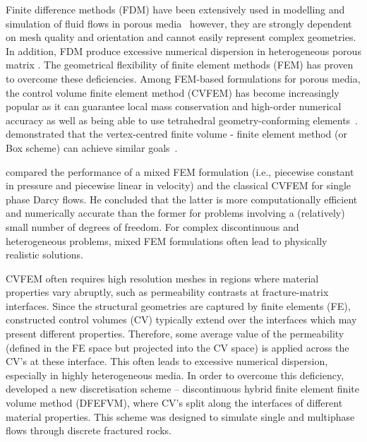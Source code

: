 \documentclass[preprint,authoryear,12pt]{elsarticle}
\begin{document}
Finite difference methods (FDM) have been extensively used in modelling and simulation of fluid flows in porous media~\citep{aziz_1986, chen_1997, chen_2005} however, they are strongly dependent on mesh quality and orientation and cannot easily represent complex geometries. In addition, FDM produce excessive numerical dispersion in heterogeneous porous matrix \citep{chavent_1986}. The geometrical flexibility of finite element methods (FEM) has proven to overcome these deficiencies. Among FEM-based formulations for porous media, the control volume finite element method (CVFEM) has become increasingly popular as it can guarantee local mass conservation and high-order numerical accuracy as well as being able to use tetrahedral geometry-conforming elements~\citep{forsyth_1990, cordazzo_2004, geiger_2004, hurtado_2007}.  \citet{huber_2000} demonstrated that the vertex-centred finite volume - finite element method (or Box scheme) can achieve similar goals~\citep[see also][]{helmig_1997}.

\citet{durlofsky_1993,durlofsky_1994} compared the performance of a mixed FEM formulation (i.e., piecewise constant in pressure and piecewise linear in velocity) and the classical CVFEM for single phase Darcy flows. He concluded that the latter is more computationally efficient and numerically accurate than the former for problems involving a (relatively) small number of degrees of freedom. For complex discontinuous and heterogeneous problems, mixed FEM formulations often lead to physically realistic solutions.

\medskip

CVFEM often requires high resolution meshes in regions where material properties vary abruptly, such as permeability contrasts at fracture-matrix interfaces. Since the structural geometries are captured by finite elements (FE), constructed control volumes (CV) typically extend over the interfaces which may present different properties. Therefore, some average value of the permeability (defined in the FE space but projected into the CV space) is applied across the CV's at these interface. This often leads to excessive numerical dispersion, especially in highly heterogeneous media. In order to overcome this deficiency, \citet{nick_2011b, nick_2011a} developed a new discretisation scheme -- discontinuous hybrid finite element finite volume method (DFEFVM), where CV's split along the interfaces of different material properties. This scheme was designed to simulate single and multiphase flows through discrete fractured rocks. 
\end{document}
